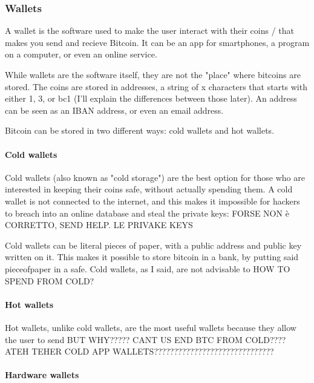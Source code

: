 \documentclass {article}
\begin{document}
\subsubsection {Wallets}



A wallet is the software used to make the user interact with their coins / that makes you send and recieve Bitcoin. It can be an app for smartphones, a program on a computer, or even an online service.

While wallets are the software itself, they are not the "place" where bitcoins are stored. The coins are stored in addresses, a string of x characters that starts with either 1, 3, or bc1 (I'll explain the differences between those later). An address can be seen as an IBAN address, or even an email address.

Bitcoin can be stored in two different ways: cold wallets and hot wallets.



\paragraph {Cold wallets}



Cold wallets (also known as "cold storage") are the best option for those who are interested in keeping their coins safe, without actually spending them. A cold wallet is not connected to the internet, and this makes it impossible for hackers to breach into an online database and steal the private keys: FORSE NON è CORRETTO, SEND HELP. LE PRIVAKE KEYS 

Cold wallets can be literal pieces of paper, with a public address and public key written on it. This makes it possible to store bitcoin in a bank, by putting said pieceofpaper in a safe.
Cold wallets, as I said, are not advisable to HOW TO SPEND FROM COLD?



\paragraph {Hot wallets}



Hot wallets, unlike cold wallets, are the most useful wallets because they allow the user to send BUT WHY????? CANT US END BTC FROM COLD???? ATEH TEHER COLD APP WALLETS??????????????????????????????



\paragraph {Hardware wallets}
\end{document}

